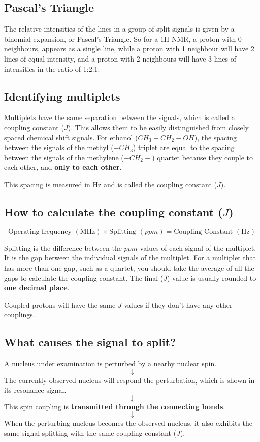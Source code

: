 \documentclass[11pt]{article}
\begin{document}
\subsection{Pascal's Triangle}
\label{sec:orga14c8a5}
The relative intensities of the lines in a group of split signals is given by a binomial expansion, or Pascal's Triangle. So for a 1H-NMR, a proton with 0 neighbours, appears as a single line, while a proton with 1 neighbour will have 2 lines of equal intensity, and a proton with 2 neighbours will have 3 lines of intensities in the ratio of 1:2:1.
\subsection{Identifying multiplets}
\label{sec:orgd6bb8d4}
Multiplets have the same separation between the signals, which is called a coupling constant (\(J\)). This allows them to be easily distinguished from closely spaced chemical shift signals. For ethanol (\(CH_3 - CH_2 - OH\)), the spacing between the signals of the methyl (\(-CH_3\)) triplet are equal to the spacing between the signals of the methylene (\(-CH_2-\)) quartet because they couple to each other, and \textbf{only to each other}.


This spacing is measured in \(\si{\hertz}\) and is called the coupling constant (\(J\)).
\subsection{How to calculate the coupling constant (\(J\))}
\label{sec:org55fe6ae}
\[\text{Operating frequency } (\si{\mega\hertz}) \times \text{Splitting } (\si{ppm}) = \text{Coupling Constant } (\si{\hertz})\]

Splitting is the difference between the \(\si{ppm}\) values of each signal of the multiplet. It is the gap between the individual signals of the multiplet. For a multiplet that has more than one gap, such as a quartet, you should take the average of all the gaps to calculate the coupling constant. The final (\(J\)) value is usually rounded to \textbf{one decimal place}.

Coupled protons will have the same \(J\) values if they don't have any other couplings.

\newpage
\subsection{What causes the signal to split?}
\label{sec:org2cd0631}
A nucleus under examination is perturbed by a nearby nuclear spin.
\[\downarrow\]
The currently observed nucleus will respond the perturbation, which is shown in its resonance signal.
\[\downarrow\]
This spin coupling is \textbf{transmitted through the connecting bonds}.
\[\downarrow\]
When the perturbing nucleus becomes the observed nucleus, it also exhibits the same signal splitting with the same coupling constant (\(J\)).
\end{document}
